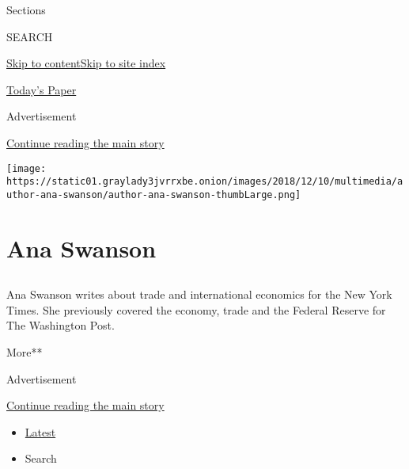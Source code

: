 Sections

SEARCH

\protect\hyperlink{site-content}{Skip to
content}\protect\hyperlink{site-index}{Skip to site index}

\href{https://myaccount.nytimes3xbfgragh.onion/auth/login?response_type=cookie\&client_id=vi}{}

\href{https://www.nytimes3xbfgragh.onion/section/todayspaper}{Today's
Paper}

Advertisement

\protect\hyperlink{after-top}{Continue reading the main story}

\texttt{[image: https://static01.graylady3jvrrxbe.onion/images/2018/12/10/multimedia/author-ana-swanson/author-ana-swanson-thumbLarge.png]}

\hypertarget{ana-swanson}{%
\section{Ana Swanson}\label{ana-swanson}}

\subsection{}

Ana Swanson writes about trade and international economics for the New
York Times. She previously covered the economy, trade and the Federal
Reserve for The Washington Post.

More**

Advertisement

\protect\hyperlink{after-mid1}{Continue reading the main story}

\begin{itemize}
\tightlist
\item
  \protect\hyperlink{stream-panel}{Latest}
\item
  Search
\end{itemize}

